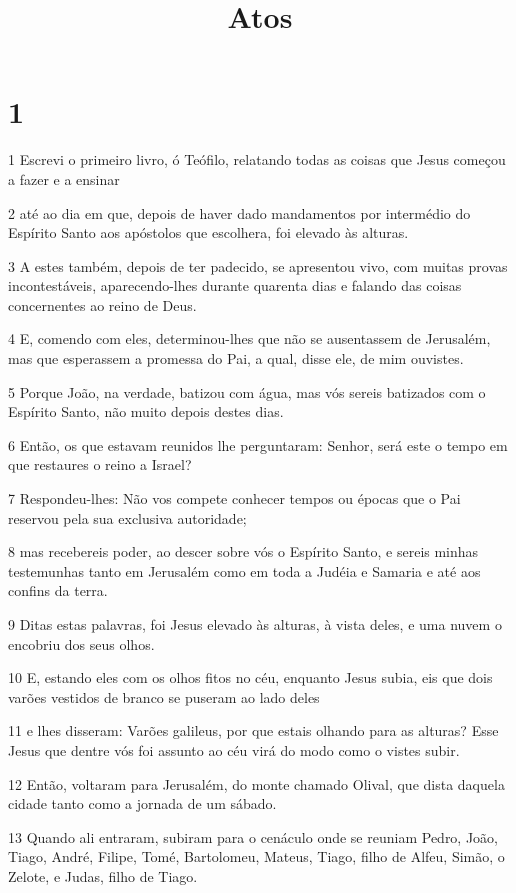 

\title{Atos}


\chapter{1}

\par 1 Escrevi o primeiro livro, ó Teófilo, relatando todas as coisas que Jesus começou a fazer e a ensinar
\par 2 até ao dia em que, depois de haver dado mandamentos por intermédio do Espírito Santo aos apóstolos que escolhera, foi elevado às alturas.
\par 3 A estes também, depois de ter padecido, se apresentou vivo, com muitas provas incontestáveis, aparecendo-lhes durante quarenta dias e falando das coisas concernentes ao reino de Deus.
\par 4 E, comendo com eles, determinou-lhes que não se ausentassem de Jerusalém, mas que esperassem a promessa do Pai, a qual, disse ele, de mim ouvistes.
\par 5 Porque João, na verdade, batizou com água, mas vós sereis batizados com o Espírito Santo, não muito depois destes dias.
\par 6 Então, os que estavam reunidos lhe perguntaram: Senhor, será este o tempo em que restaures o reino a Israel?
\par 7 Respondeu-lhes: Não vos compete conhecer tempos ou épocas que o Pai reservou pela sua exclusiva autoridade;
\par 8 mas recebereis poder, ao descer sobre vós o Espírito Santo, e sereis minhas testemunhas tanto em Jerusalém como em toda a Judéia e Samaria e até aos confins da terra.
\par 9 Ditas estas palavras, foi Jesus elevado às alturas, à vista deles, e uma nuvem o encobriu dos seus olhos.
\par 10 E, estando eles com os olhos fitos no céu, enquanto Jesus subia, eis que dois varões vestidos de branco se puseram ao lado deles
\par 11 e lhes disseram: Varões galileus, por que estais olhando para as alturas? Esse Jesus que dentre vós foi assunto ao céu virá do modo como o vistes subir.
\par 12 Então, voltaram para Jerusalém, do monte chamado Olival, que dista daquela cidade tanto como a jornada de um sábado.
\par 13 Quando ali entraram, subiram para o cenáculo onde se reuniam Pedro, João, Tiago, André, Filipe, Tomé, Bartolomeu, Mateus, Tiago, filho de Alfeu, Simão, o Zelote, e Judas, filho de Tiago.
